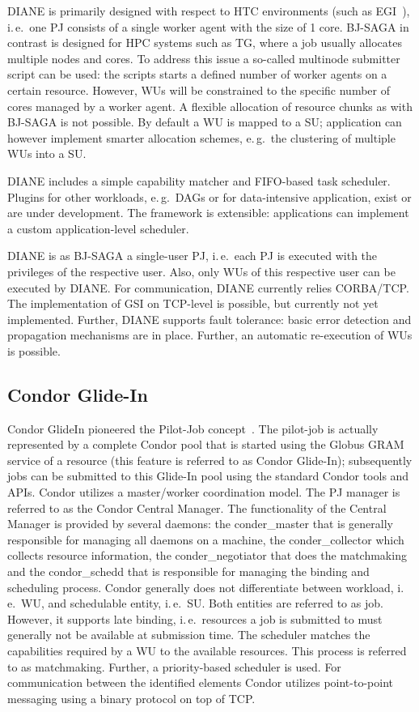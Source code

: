 \documentclass[conference,final]{IEEEtran}
\newcommand{\upp}{\vspace*{-0.5em}}
\begin{document}
DIANE is primarily designed with respect to HTC environments (such as
EGI~\cite{egi}), i.\,e.\ one PJ consists of a single worker agent with the size
of 1 core. BJ-SAGA in contrast is designed for HPC systems such as TG, where a
job usually allocates multiple nodes and cores. To address this issue a
so-called multinode submitter script can be used: the scripts starts a defined
number of worker agents on a certain resource. However, WUs will be constrained
to the specific number of cores managed by a worker agent. A flexible allocation
of resource chunks as with BJ-SAGA is not possible. By default a WU is mapped to
a SU; application can however implement smarter allocation schemes, e.\,g.\ the
clustering of multiple WUs into a SU.

DIANE includes a simple capability matcher and FIFO-based task scheduler.
Plugins for other workloads, e.\,g.\ DAGs or for data-intensive
application, exist or are under development. The framework is extensible:
applications can implement a custom application-level scheduler.


DIANE is as BJ-SAGA a single-user PJ, i.\,e.\ each PJ is executed with the
privileges of the respective user. Also, only WUs of this respective user can be
executed by DIANE. For communication, DIANE currently relies CORBA/TCP. The 
implementation of GSI on TCP-level is possible, but currently not yet 
implemented. Further, DIANE supports fault tolerance: basic error detection and propagation mechanisms are in place. Further, an automatic re-execution of WUs is possible.


\subsection{Condor Glide-In\upp\upp}

Condor GlideIn pioneered the Pilot-Job concept~\cite{condor-g}. The pilot-job is
actually represented by a complete Condor pool that is started using the Globus
GRAM service of a resource (this feature is referred to as Condor Glide-In);
subsequently jobs can be submitted to this Glide-In pool using the standard
Condor tools and APIs. Condor utilizes a master/worker coordination model. The
PJ manager is referred to as the Condor Central Manager. The functionality of
the Central Manager is provided by several daemons: the conder\_master that is
generally responsible for managing all daemons on a machine, the
conder\_collector which collects resource information, the conder\_negotiator
that does the matchmaking and the condor\_schedd that is responsible for
managing the binding and scheduling process. Condor generally does not
differentiate between workload, i.\,e.\ WU, and schedulable entity, i.\,e.\ SU.
Both entities are referred to as job. However, it supports late binding,
i.\,e.\ resources a job is submitted to must generally not be available at
submission time. The scheduler matches the capabilities required by a WU to the
available resources. This process is referred to as matchmaking. Further, a
priority-based scheduler is used. For communication between the identified
elements Condor utilizes point-to-point messaging using a binary protocol on top
of TCP.
\end{document}

